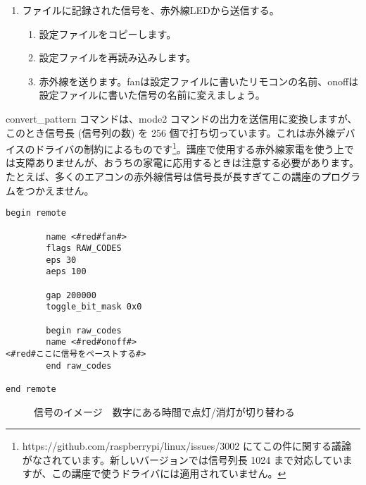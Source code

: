 \begin{tcolorbox}[title=\useOmetoi]
\begin{enumerate}
\begin{enumerate}[1]
 \end{enumerate}
\item ファイルに記録された信号を、赤外線LEDから送信する。
 \begin{enumerate}[1]
  \item 設定ファイルをコピーします。 \\ 
  \item 設定ファイルを再読み込みします。\\ 
  \item 赤外線を送ります。fanは設定ファイルに書いたリモコンの名前、onoffは設定ファイルに書いた信号の名前に変えましょう。\\ 
 \end{enumerate}
\end{enumerate}
\end{tcolorbox}

convert\_pattern コマンドは、mode2 コマンドの出力を送信用に変換しますが、このとき信号長 (信号列の数) を 256 個で打ち切っています。これは赤外線デバイスのドライバの制約によるものです\footnote{https://github.com/raspberrypi/linux/issues/3002 にてこの件に関する議論がなされています。新しいバージョンでは信号列長 1024 まで対応していますが、この講座で使うドライバには適用されていません。}。講座で使用する赤外線家電を使う上では支障ありませんが、おうちの家電に応用するときは注意する必要があります。たとえば、多くのエアコンの赤外線信号は信号長が長すぎてこの講座のプログラムをつかえません。\\
\begin{lstlisting}[caption=template.lircd.conf,label=template.lircd.conf]
begin remote

        name <#red#fan#>
        flags RAW_CODES
        eps 30
        aeps 100

        gap 200000
        toggle_bit_mask 0x0

        begin raw_codes
        name <#red#onoff#>
<#red#ここに信号をペーストする#>
        end raw_codes

end remote
\end{lstlisting}

\begin{figure}[H]
    \centering
 
    \caption{信号のイメージ　数字にある時間で点灯/消灯が切り替わる}
\end{figure}
